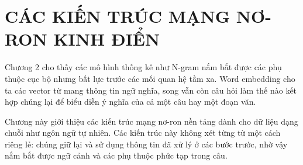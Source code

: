 \chapter{CÁC KIẾN TRÚC MẠNG NƠ-RON KINH ĐIỂN}
\label{chap:deep_learning_architectures}

Chương 2 cho thấy các mô hình thống kê như N-gram nắm bắt được các phụ thuộc cục bộ nhưng bất lực trước các mối quan hệ tầm xa. Word embedding cho ta các vector từ mang thông tin ngữ nghĩa, song vẫn còn câu hỏi làm thế nào kết hợp chúng lại để biểu diễn ý nghĩa của cả một câu hay một đoạn văn.

Chương này giới thiệu các kiến trúc mạng nơ-ron nền tảng dành cho dữ liệu dạng chuỗi như ngôn ngữ tự nhiên. Các kiến trúc này không xét từng từ một cách riêng lẻ: chúng giữ lại và sử dụng thông tin đã xử lý ở các bước trước, nhờ vậy nắm bắt được ngữ cảnh và các phụ thuộc phức tạp trong câu.